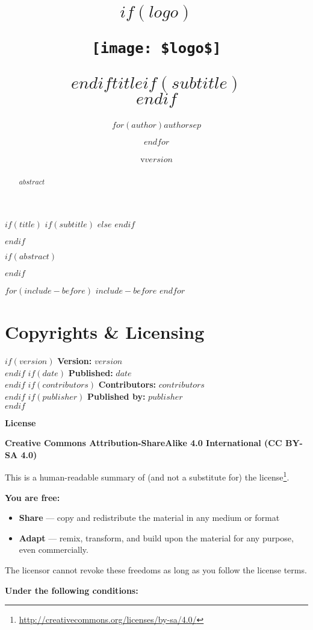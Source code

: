 \documentclass[$if(fontsize)$$fontsize$,$endif$$if(lang)$$lang$,$endif$$if(papersize)$$papersize$,$endif$$for(classoption)$$classoption$$sep$,$endfor$,openany,twoside]{$documentclass$}
\title{$if(logo)$\begin{center}\texttt{[image: \$logo\$]}\end{center}\vspace{\baselineskip}$endif$\Huge $title$$if(subtitle)$\\\vspace{0.5em}{\LARGE $subtitle$}$endif$}
\author{$for(author)$$author$$sep$ \and $endfor$}
\date{v$version$}
\renewcommand{\href}[2]{#2\footnote{\url{#1}}}
\begin{document}
$if(title)$
  \makeatletter
  $if(subtitle)$
  $else$
  $endif$
  \makeatother
  \maketitle
  \clearpage
$endif$


$if(abstract)$
  \begin{abstract}
  $abstract$
  \end{abstract}
  \clearpage
$endif$

$for(include-before)$
  $include-before$
$endfor$

\pagestyle{licensepage}

\section{Copyrights \& Licensing}\label{copyrights-licensing}

$if(version)$
  \textbf{Version:} $version$\\
$endif$
$if(date)$
  \textbf{Published:} $date$\\
$endif$
$if(contributors)$
  \textbf{Contributors:} $contributors$\\
$endif$
$if(publisher)$
  \textbf{Published by:} $publisher$\\
$endif$

\textbf{License}

\textbf{Creative Commons Attribution-ShareAlike 4.0 International (CC BY-SA 4.0)}

This is a human-readable summary of (and not a substitute for) the \href{http://creativecommons.org/licenses/by-sa/4.0/}{license}.

\textbf{You are free:}

\begin{itemize}
\item
  \textbf{Share} --- copy and redistribute the material in any medium or format
\item
  \textbf{Adapt} --- remix, transform, and build upon the material for any
  purpose, even commercially.
\end{itemize}

The licensor cannot revoke these freedoms as long as you follow the license terms.

\textbf{Under the following conditions:}
\end{document}
